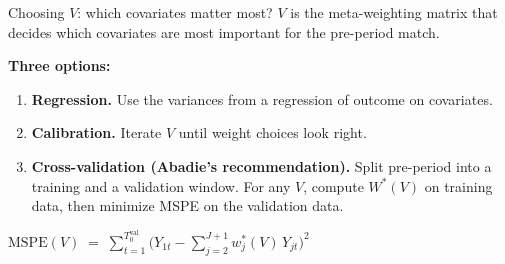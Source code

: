\documentclass[aspectratio=169,11pt]{beamer}
\begin{document}
\begin{frame}{Choosing $V$: which covariates matter most?}
\vspace{0.5em}
$V$ is the meta-weighting matrix that decides which covariates are most important for the pre-period match.

\vspace{0.5em}
\textbf{Three options:}
\vspace{0.3em}
\begin{enumerate}\small
  \item \textbf{Regression.} \;Use the variances from a regression of outcome on covariates.
  \item \textbf{Calibration.} \;Iterate $V$ until weight choices look right.
  \item \textbf{Cross-validation (Abadie's recommendation).} \;Split pre-period into a training and a validation window. For any $V$, compute $W^*(V)$ on training data, then minimize MSPE on the validation data.
\end{enumerate}

\vspace{0.6em}
\begin{center}\small
$\text{MSPE}(V) \;=\; \displaystyle\sum_{t=1}^{T_0^{\text{val}}} \bigg(Y_{1t} - \sum_{j=2}^{J+1} w_j^{*}(V)\, Y_{jt}\bigg)^2$
\end{center}

\vspace{0.4em}
\end{frame}

\end{document}
